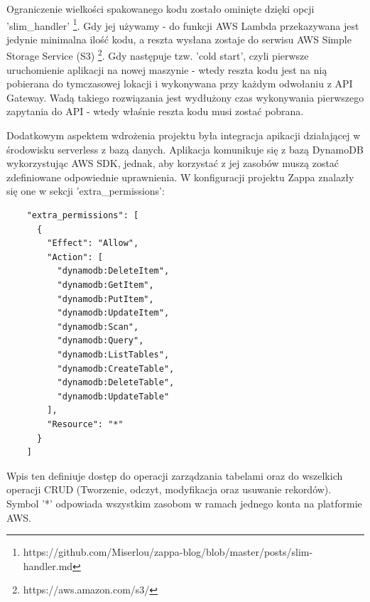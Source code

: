 Ograniczenie wielkości spakowanego kodu zostało ominięte dzięki opcji 'slim\_handler' \footnote{https://github.com/Miserlou/zappa-blog/blob/master/posts/slim-handler.md}. Gdy jej używamy - do funkcji AWS Lambda przekazywana jest jedynie minimalna ilość kodu, a reszta wysłana zostaje do serwisu AWS Simple Storage Service (S3) \footnote{https://aws.amazon.com/s3/}. Gdy następuje tzw. 'cold start', czyli pierwsze uruchomienie aplikacji na nowej maszynie - wtedy reszta kodu jest na nią pobierana do tymczasowej lokacji i wykonywana przy każdym odwołaniu z API Gateway. Wadą takiego rozwiązania jest wydłużony czas wykonywania pierwszego zapytania do API - wtedy właśnie reszta kodu musi zostać pobrana.

Dodatkowym aspektem wdrożenia projektu była integracja apikacji działającej w środowisku serverless z bazą danych. Aplikacja komunikuje się z bazą DynamoDB wykorzystując AWS SDK, jednak, aby korzystać z jej zasobów muszą zostać zdefiniowane odpowiednie uprawnienia. W konfiguracji projektu Zappa znalazły się one w sekcji 'extra\_permissions':

\begin{verbatim}
    "extra_permissions": [
      {
        "Effect": "Allow",
        "Action": [
          "dynamodb:DeleteItem",
          "dynamodb:GetItem",
          "dynamodb:PutItem",
          "dynamodb:UpdateItem",
          "dynamodb:Scan",
          "dynamodb:Query",
          "dynamodb:ListTables",
          "dynamodb:CreateTable",
          "dynamodb:DeleteTable",
          "dynamodb:UpdateTable"
        ],
        "Resource": "*"
      }
    ]
\end{verbatim}

Wpis ten definiuje dostęp do operacji zarządzania tabelami oraz do wszelkich operacji CRUD (Tworzenie, odczyt, modyfikacja oraz usuwanie rekordów). Symbol '*' odpowiada wszystkim zasobom w ramach jednego konta na platformie AWS.




